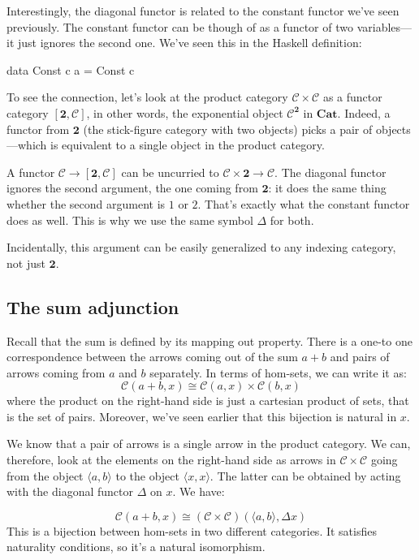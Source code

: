 \documentclass[DaoFP]{subfiles}
\begin{document}
Interestingly, the diagonal functor is related to the constant functor we've seen previously. The constant functor can be though of as a functor of two variables---it just ignores the second one. We've seen this in the Haskell definition:
\begin{haskell}
data Const c a = Const c
\end{haskell}

To see the connection, let's look at the product category $\mathcal{C} \times \mathcal{C}$ as a functor category $[ \mathbf{2}, \mathcal{C}]$, in other words, the exponential object $\mathcal{C}^{ \mathbf{2}}$ in $\mathbf{Cat}$. Indeed, a functor from $\mathbf{2}$ (the stick-figure category with two objects) picks a pair of objects---which is equivalent to a single object in the product category.


A functor $\mathcal{C} \to [\mathbf{2}, \mathcal{C}]$ can be uncurried to $\mathcal{C} \times \mathbf{2} \to  \mathcal{C}$. The diagonal functor ignores the second argument, the one coming from $\mathbf{2}$: it does the same thing whether the second argument is $1$ or $2$. That's exactly what the constant functor does as well. This is why we use the same symbol $\Delta$ for both.

Incidentally, this argument can be easily generalized to any indexing category, not just $\mathbf{2}$.

\subsection{The sum adjunction}

Recall that the sum is defined by its mapping out property. There is a one-to one correspondence between the arrows coming out of the sum $a + b$ and pairs of arrows coming from $a$ and $b$ separately. In terms of hom-sets, we can write it as:
\[  \mathcal{C} (a + b, x) \cong \mathcal{C}( a , x) \times \mathcal{C}( b , x)\]
where the product on the right-hand side is just a cartesian product of sets, that is the set of pairs. Moreover, we've seen earlier that this bijection is natural in $x$.

We know that a pair of arrows is a single arrow in the product category. We can, therefore, look at the elements on the right-hand side as arrows in $\mathcal{C} \times \mathcal{C}$ going from the object $\langle a, b \rangle$ to the object $\langle x, x \rangle$. The latter can be obtained by acting with the diagonal functor $\Delta$ on $x$. We have:

\[  \mathcal{C} (a + b, x) \cong (\mathcal{C} \times \mathcal{C})( \langle a, b \rangle , \Delta x)\]
This is a bijection between hom-sets in two different categories. It satisfies naturality conditions, so it's a natural isomorphism. 
\end{document}
